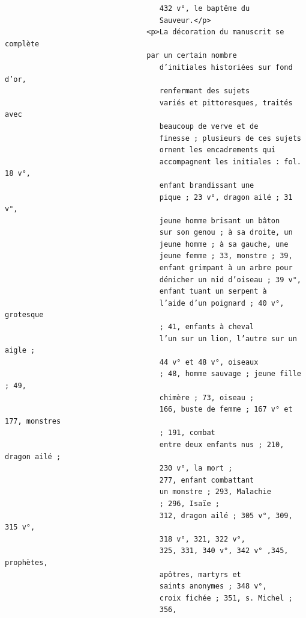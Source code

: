 \documentclass[a4paper,12pt,twoside]{book}
\begin{document}
\begin{verbatim}
                                    432 v°, le baptême du
                                    Sauveur.</p>
                                 <p>La décoration du manuscrit se complète
                                 par un certain nombre
                                    d’initiales historiées sur fond d’or, 
                                    renfermant des sujets
                                    variés et pittoresques, traités avec 
                                    beaucoup de verve et de
                                    finesse ; plusieurs de ces sujets 
                                    ornent les encadrements qui
                                    accompagnent les initiales : fol. 18 v°,
                                    enfant brandissant une
                                    pique ; 23 v°, dragon ailé ; 31 v°,
                                    jeune homme brisant un bâton
                                    sur son genou ; à sa droite, un 
                                    jeune homme ; à sa gauche, une
                                    jeune femme ; 33, monstre ; 39, 
                                    enfant grimpant à un arbre pour
                                    dénicher un nid d’oiseau ; 39 v°,
                                    enfant tuant un serpent à
                                    l’aide d’un poignard ; 40 v°, grotesque 
                                    ; 41, enfants à cheval
                                    l’un sur un lion, l’autre sur un aigle ;
                                    44 v° et 48 v°, oiseaux
                                    ; 48, homme sauvage ; jeune fille ; 49,
                                    chimère ; 73, oiseau ;
                                    166, buste de femme ; 167 v° et 177, monstres
                                    ; 191, combat
                                    entre deux enfants nus ; 210, dragon ailé ;
                                    230 v°, la mort ;
                                    277, enfant combattant 
                                    un monstre ; 293, Malachie
                                    ; 296, Isaïe ;
                                    312, dragon ailé ; 305 v°, 309, 315 v°,
                                    318 v°, 321, 322 v°,
                                    325, 331, 340 v°, 342 v° ,345, prophètes,
                                    apôtres, martyrs et
                                    saints anonymes ; 348 v°, 
                                    croix fichée ; 351, s. Michel ;
                                    356,

\end{verbatim}
\end{document}
